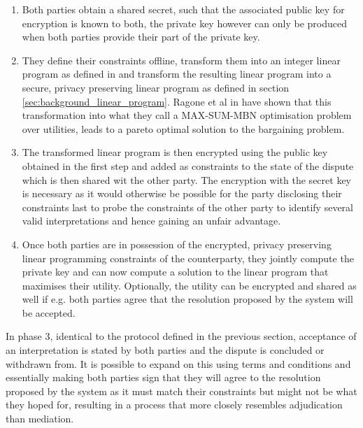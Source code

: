 \documentclass[12pt,msc,a4paper,oneside]{ucl_thesis}
\begin{document}
\begin{enumerate}
    \item Both parties obtain a shared secret, such that the associated public key for encryption is known to both, the private key however can only be produced when both parties provide their part of the private key.
    \item They define their constraints offline, transform them into an integer linear program as defined in \cite{Ragone2008} and transform the resulting linear program into a secure, privacy preserving linear program as defined in section \ref{sec:background_linear_program}. Ragone et al in \cite{Ragone2008} have shown that this transformation into what they call a MAX-SUM-MBN optimisation problem over utilities, leads to a pareto optimal solution to the bargaining problem.
    \item The transformed linear program is then encrypted using the public key obtained in the first step and added as constraints to the state of the dispute which is then shared wit the other party. The encryption with the secret key is necessary as it would otherwise be possible for the party disclosing their constraints last to probe the constraints of the other party to identify several valid interpretations and hence gaining an unfair advantage.
    \item Once both parties are in possession of the encrypted, privacy preserving linear programming constraints of the counterparty, they jointly compute the private key and can now compute a solution to the linear program that maximises their utility. Optionally, the utility can be encrypted and shared as well if e.g. both parties agree that the resolution proposed by the system will be accepted.
\end{enumerate}
In phase 3, identical to the protocol defined in the previous section, acceptance of an interpretation is stated by both parties and the dispute is concluded or withdrawn from. It is possible to expand on this using terms and conditions and essentially making both parties sign that they will agree to the resolution proposed by the system as it must match their constraints but might not be what they hoped for, resulting in a process that more closely resembles adjudication than mediation.
\end{document}
